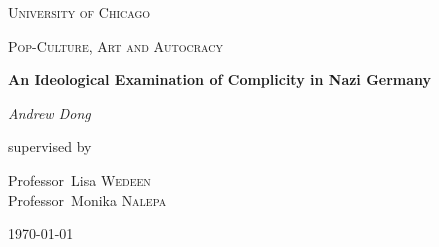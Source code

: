 \documentclass[a4paper, 11pt]{article} %
\begin{document}
\clearpage

\begin{titlepage}
	\centering
	{\scshape\LARGE University of Chicago \par}
	\vspace{1cm}
	{\scshape\Large Pop-Culture, Art and Autocracy\par}
	\vspace{1.5cm}
	{\huge\bfseries An Ideological Examination of Complicity in Nazi Germany\par}
	\vspace{1cm}
	{\Large\itshape Andrew Dong\par}
	\vspace{2cm}
	
	\begin{abstract}
	\singlespacing
	
	
	
In this paper we will deal with the following question:	
	
\textbf{Consider the two propositions: "they do not know, but they are doing it" and "they all know very well what they are doing, but still they are doing it."  Which better describes citizens' relationship to authoritarian rule in your opinion?  What about artists' attitudes? }

We'll be examining this problem in the context of civilian and artistic consent to the Nazi Party.  In particular we will study the role that Ideological State Apparatuses played in the perpetuation and execution of Nazi beliefs.  The paper will begin with a discussion of Althusserian Structuralism and then analyze Zizek's psychoanalytic concept of Ideology not as a simple propagandist tool but instead as a complex and integral component of human life.  From these we will derive the theory needed in order to examine our two main case studies: \textbf{Eichmann in Jerusalem} and \textit{Mephisto}.  



\end{abstract}
	\vfill



	supervised by\par
	Professor~Lisa \textsc{Wedeen}
	\\ Professor~Monika \textsc{Nalepa}
	\vspace{5 mm}
	\\{\large \today\par}
\end{titlepage}
\end{document}
